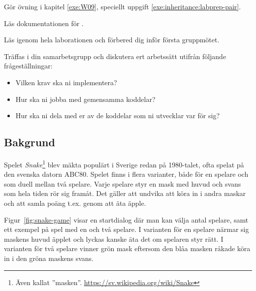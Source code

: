
\Teamlab{\LabWeekNINE}

\begin{Goals}

\end{Goals}

\begin{Preparations}
\item Gör övning {\tt \ExeWeekNINE} i kapitel \ref{exe:W09}, speciellt uppgift \ref{exe:inheritance:labprep-pair}.
\item Läs dokumentationen för .
\item Läs igenom hela laborationen och förbered dig inför första gruppmötet.

\item Träffas i din samarbetsgrupp och diskutera ert arbetssätt utifrån följande frågeställningar:
\begin{itemize}[nolistsep]
  \item Vilken krav ska ni implementera?
  \item Hur ska ni jobba med gemensamma koddelar?
  \item Hur ska ni dela med er av de koddelar som ni utvecklar var för sig?
\end{itemize}

\end{Preparations}

\subsection{Bakgrund}

Spelet \emph{Snake}\footnote{Även kallat ''masken''. \url{https://sv.wikipedia.org/wiki/Snake}} blev mäkta populärt i Sverige redan på 1980-talet, ofta spelat på den svenska datorn ABC80. Spelet finns i flera varianter, både för en spelare och som duell mellan två spelare. Varje spelare styr en mask med huvud och svans som hela tiden rör sig framåt. Det gäller att undvika att köra in i andra maskar och att samla poäng t.ex. genom att äta äpple.

Figur~\ref{fig:snake-game} visar en startdialog där man kan välja antal spelare, samt ett exempel på spel med en och två spelare. I varianten för en spelare närmar sig maskens huvud äpplet och lyckas kanske äta det om spelaren styr rätt.  I varianten för två spelare vinner grön mask eftersom den blåa masken råkade köra in i den gröna maskens svans.

